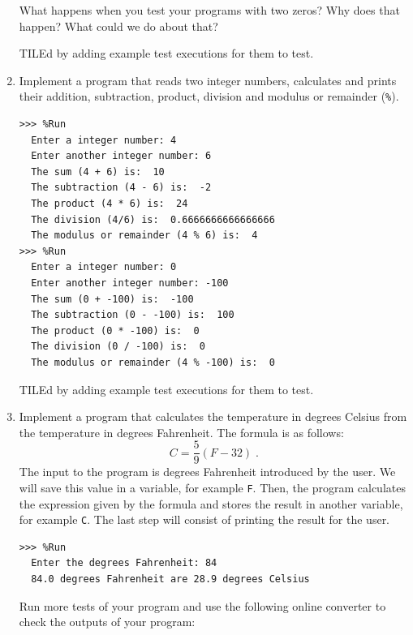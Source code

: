 \documentclass[
  fontsize=10pt,
  a4paper,
]{scrartcl}
\newenvironment{howTILEd}%
  {\begin{mdframed}[skipabove=10pt,skipbelow=10pt,backgroundcolor=pink!40]}%
  {\end{mdframed}}
\begin{document}
\begin{enumerate}
What happens when you test your programs with two zeros? Why does that happen? What could we do about that? 

\begin{howTILEd}
TILEd by adding example test executions for them to test.
\end{howTILEd}

\item Implement a program that reads two integer numbers, calculates and prints their addition, subtraction, product, division and modulus or remainder (\verb+%+). 

\begin{Verbatim}[frame=single, label={\em example test execution of the program}]
>>> %Run 
  Enter a integer number: 4
  Enter another integer number: 6
  The sum (4 + 6) is:  10
  The subtraction (4 - 6) is:  -2
  The product (4 * 6) is:  24
  The division (4/6) is:  0.6666666666666666
  The modulus or remainder (4 % 6) is:  4
>>> %Run 
  Enter a integer number: 0
  Enter another integer number: -100
  The sum (0 + -100) is:  -100
  The subtraction (0 - -100) is:  100
  The product (0 * -100) is:  0
  The division (0 / -100) is:  0
  The modulus or remainder (4 % -100) is:  0
\end{Verbatim}

\begin{howTILEd}
TILEd by adding example test executions for them to test.
\end{howTILEd}

\item Implement a program that calculates the temperature in degrees Celsius from the temperature in degrees Fahrenheit.
The formula is as follows:
\begin{displaymath}
  C = \frac{5}{9}(F-32)\;.
\end{displaymath} 
The input to the program is degrees Fahrenheit introduced by the user. We will save this value in a variable, for example \verb+F+. Then, the program calculates the expression given by the formula and stores the result in another variable, for example \verb+C+. The last step will consist of printing the result for the user.

\begin{Verbatim}[frame=single, label={\em example test execution of the program}]
>>> %Run 
  Enter the degrees Fahrenheit: 84
  84.0 degrees Fahrenheit are 28.9 degrees Celsius
\end{Verbatim}

Run more tests of your program and use the following online converter to check the outputs of your program:


\end{enumerate}
\end{document}
